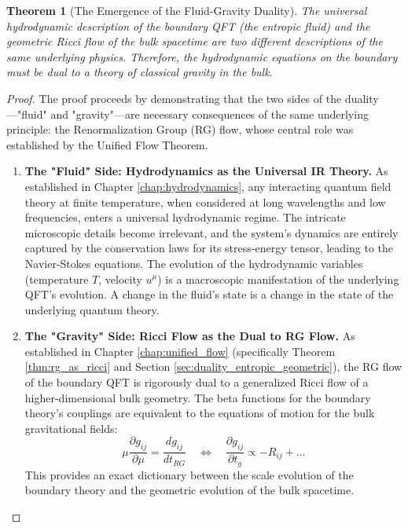 \documentclass[11pt, letterpaper]{report}
\theoremstyle{plain} %
\newtheorem{theorem}{Theorem}[chapter]
\theoremstyle{definition} %
\theoremstyle{remark} %
\begin{document}
\begin{theorem}[The Emergence of the Fluid-Gravity Duality]
\label{thm:emergence_fluid_gravity}
The universal hydrodynamic description of the boundary QFT (the entropic fluid) and the geometric Ricci flow of the bulk spacetime are two different descriptions of the same underlying physics. Therefore, the hydrodynamic equations on the boundary must be dual to a theory of classical gravity in the bulk.
\end{theorem}
\begin{proof}
The proof proceeds by demonstrating that the two sides of the duality—"fluid" and "gravity"—are necessary consequences of the same underlying principle: the Renormalization Group (RG) flow, whose central role was established by the Unified Flow Theorem.

\begin{enumerate}
    \item \textbf{The "Fluid" Side: Hydrodynamics as the Universal IR Theory.}
    As established in Chapter \ref{chap:hydrodynamics}, any interacting quantum field theory at finite temperature, when considered at long wavelengths and low frequencies, enters a universal hydrodynamic regime. The intricate microscopic details become irrelevant, and the system's dynamics are entirely captured by the conservation laws for its stress-energy tensor, leading to the Navier-Stokes equations. The evolution of the hydrodynamic variables (temperature $T$, velocity $u^\mu$) is a macroscopic manifestation of the underlying QFT's evolution. A change in the fluid's state is a change in the state of the underlying quantum theory.

    \item \textbf{The "Gravity" Side: Ricci Flow as the Dual to RG Flow.}
    As established in Chapter \ref{chap:unified_flow} (specifically Theorem \ref{thm:rg_as_ricci} and Section \ref{sec:duality_entropic_geometric}), the RG flow of the boundary QFT is rigorously dual to a generalized Ricci flow of a higher-dimensional bulk geometry. The beta functions for the boundary theory's couplings are equivalent to the equations of motion for the bulk gravitational fields:
    \begin{equation}
        \mu\frac{\partial g_{ij}}{\partial\mu} = \frac{dg_{ij}}{dt_{RG}} \quad \Longleftrightarrow \quad \frac{\partial g_{ij}}{\partial t_g} \propto -R_{ij} + \dots
    \end{equation}
    This provides an exact dictionary between the scale evolution of the boundary theory and the geometric evolution of the bulk spacetime.


\end{enumerate}
\end{proof}
\end{document}
